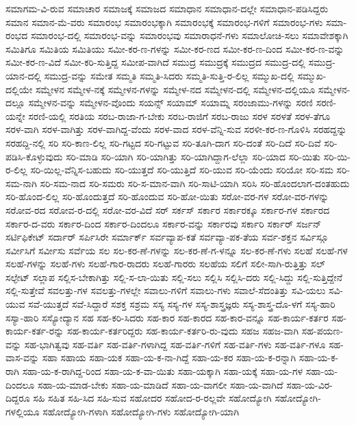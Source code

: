 {ಸಮಾಗಮ-ವಿ-ರುವ
ಸಮಾಚಾರ
ಸಮಾಜಕ್ಕೆ
ಸಮಾಜದ
ಸಮಾಧಾನ
ಸಮಾಧಾನ-ದಲ್ಲೇ
ಸಮಾಧಾನ-ಪಡಿಸಿದ್ದರು
ಸಮಾನ
ಸಮಾನ-ಮೆ-ವರು
ಸಮಾರಂಭ
ಸಮಾರಂಭಕ್ಕಾಗಿ
ಸಮಾರಂಭಕ್ಕೆ
ಸಮಾರಂಭ-ಗಳಿಗೆ
ಸಮಾರಂಭ-ಗಳು
ಸಮಾ-ರಂಭದ
ಸಮಾರಂಭ-ದಲ್ಲಿ
ಸಮಾರಂಭ-ವನ್ನು
ಸಮಾರಂಭವು
ಸಮಾರಾಧನೆ-ಗಳು
ಸಮಾಲೋಚಿ-ಸಲು
ಸಮಾವೇಶಕ್ಕಾಗಿ
ಸಮಿತಿಗೂ
ಸಮಿತಿಯ
ಸಮಿತಿಯು
ಸಮೀ-ಕರ-ಣ-ಗಳನ್ನು
ಸಮೀ-ಕರ-ಣದ
ಸಮೀ-ಕರ-ಣ-ದಿಂದ
ಸಮೀ-ಕರ-ಣ-ವನ್ನು
ಸಮೀ-ಕರ-ಣ-ವಿದೆ
ಸಮೀ-ಕರಿ-ಸುತ್ತಿದ್ದ
ಸಮೀಪ-ವಾಗಿದೆ
ಸಮುದ್ರ
ಸಮುದ್ರಕ್ಕೆ
ಸಮುದ್ರದ
ಸಮುದ್ರ-ದಲ್ಲಿ
ಸಮುದ್ರ-ಯಾನ-ದಲ್ಲಿ
ಸಮುದ್ರ-ವನ್ನು
ಸಮೇತ
ಸಮ್ಮತಿ
ಸಮ್ಮತಿ-ಸಿದರು
ಸಮ್ಮತಿ-ಸುತ್ತಿ-ರ-ಲಿಲ್ಲ
ಸಮ್ಮುಖ-ದಲ್ಲಿ
ಸಮ್ಮುಖ-ದಲ್ಲಿಯೇ
ಸಮ್ಮೇಳನ
ಸಮ್ಮೇಳ-ನಕ್ಕೆ
ಸಮ್ಮೇಳನ-ಗಳನ್ನು
ಸಮ್ಮೇಳ-ನದ
ಸಮ್ಮೇಳನ-ದಲ್ಲಿ
ಸಮ್ಮೇಳನ-ದಲ್ಲಿಯೂ
ಸಮ್ಮೇಳನ-ದಲ್ಲೂ
ಸಮ್ಮೇಳನ-ವನ್ನು
ಸಮ್ಮೇಳನ-ವೊಂದು
ಸಯನ್ಸ್
ಸಯಾಮ್
ಸಯಾಮ್ನ
ಸರಂಜಾಮು-ಗಳನ್ನು
ಸರಣಿ
ಸರಣಿ-ಯನ್ನೇ
ಸರಣಿ-ಯಲ್ಲಿ
ಸರತಿಯ
ಸರಬ-ರಾಜಾ-ಗ-ಬೇಕು
ಸರಬ-ರಾಜಿಗೆ
ಸರಬ-ರಾಜು
ಸರಳ
ಸರಳತೆ
ಸರಳ-ತೆಗೂ
ಸರಳ-ವಾಗಿ
ಸರಳ-ವಾಗಿತ್ತು
ಸರಳ-ವಾಗಿದ್ದ-ವೆಂದು
ಸರಳ-ವಾದ
ಸರಳ-ವೆನ್ನಿ-ಸುವ
ಸರಳೀ-ಕರ-ಣ-ಗೊಳಿಸಿ
ಸರಹದ್ದನ್ನು
ಸರಹದ್ದಿ-ನಲ್ಲಿ
ಸರಿ
ಸರಿ-ಕಾಣ-ಲಿಲ್ಲ
ಸರಿ-ಗಟ್ಟದ
ಸರಿ-ಗಟ್ಟುವ
ಸರಿ-ತೂಗಿ-ದಾಗ
ಸರಿ-ದಂತೆ
ಸರಿ-ದಿದೆ
ಸರಿ-ದಿವೆ
ಸರಿ-ಪಡಿಸಿ-ಕೊಳ್ಳುವುದು
ಸರಿ-ಮಾಡಿ
ಸರಿ-ಯಾಗಿ
ಸರಿ-ಯಾಗಿತ್ತು
ಸರಿ-ಯಾಗಿದ್ದಾಗ-ಲೆಲ್ಲಾ
ಸರಿ-ಯಾದ
ಸರಿ-ಯಿತು
ಸರಿ-ಯಿ-ರ-ಲಿಲ್ಲ
ಸರಿ-ಯಿಲ್ಲ-ವೆನ್ನಿಸ-ಬಹುದು
ಸರಿ-ಯುತ್ತದೆ
ಸರಿ-ಯುತ್ತಿದೆ
ಸರಿ-ಯುವ
ಸರಿ-ಯೆಂದು
ಸರಿಯೋ
ಸರಿ-ಸಮ
ಸರಿ-ಸಮ-ನಾಗಿ
ಸರಿ-ಸಮ-ನಾದ
ಸರಿ-ಸಮರು
ಸರಿ-ಸ-ಮಾನ-ವಾಗಿ
ಸರಿ-ಸಾಟಿ-ಯಾಗಿ
ಸರಿಸಿ
ಸರಿ-ಹೊಂದಲಾಗ-ದಂತಹುದು
ಸರಿ-ಹೊಂದ-ಲಿಲ್ಲ
ಸರಿ-ಹೊಂದುತ್ತದೆ
ಸರಿ-ಹೊಂದುವ
ಸರಿ-ಹೋ-ಯಿತು
ಸರೋ-ವರ-ಗಳ
ಸರೋ-ವರ-ಗಳನ್ನು
ಸರೋವ-ರದ
ಸರೋವ-ರ-ದಲ್ಲಿ
ಸರೋ-ವರ-ವಿದೆ
ಸರ್
ಸರ್ಕಸ್
ಸರ್ಕಾರ
ಸರ್ಕಾರಕ್ಕೂ
ಸರ್ಕಾರ-ಗಳ
ಸರ್ಕಾರದ
ಸರ್ಕಾರ-ದ-ವರು
ಸರ್ಕಾರ-ದಿಂದ
ಸರ್ಕಾರ-ದಿಂದಲೂ
ಸರ್ಕಾರ-ವನ್ನು
ಸರ್ಕಾರವು
ಸರ್ಕಾರಿ
ಸರ್ಕಾರ್
ಸರ್ಜನ್
ಸರ್ಟಿಫಿಕೇಟ್
ಸರ್ದಾರ್
ಸರ್ಪಿಸಿರೇ
ಸರ್ಮಾರ್ಕ್
ಸರ್ವವ್ಯಾಪ-ಕತೆ
ಸರ್ವವ್ಯಾ-ಪಕ-ತೆಯ
ಸರ್ವ-ಶಕ್ತನ
ಸರ್ವಿಸ್ಗೂ
ಸರ್ವೀಸಿಗೆ
ಸರ್ವೀಸು
ಸರ್ವೆಯ
ಸಲ
ಸಲ-ಕರ-ಣೆ-ಗಳನ್ನು
ಸಲ-ಕರ-ಣೆ-ಗ-ಳನ್ನೂ
ಸಲ-ಕರ-ಣೆ-ಗಳು
ಸಲಹೆ
ಸಲಹೆ-ಗಳ
ಸಲಹೆ-ಗಳನ್ನು
ಸಲಹೆ-ಗಳು
ಸಲಹೆ-ಗಾರ-ರಾದರು
ಸಲಹೆ-ಗಾರರು
ಸಲಹೆಯ
ಸಲಿಗೆ
ಸಲೀ-ಸಾಗಿ-ರುತ್ತಿತ್ತು
ಸಲ್
ಸಲ್ಫೇಟ್
ಸಲ್ಲಾಪ
ಸಲ್ಲಿಸ-ಬೇಕಾಗಿತ್ತು
ಸಲ್ಲಿ-ಸ-ಲಾ-ಯಿತು
ಸಲ್ಲಿ-ಸಲು
ಸಲ್ಲಿಸಿ
ಸಲ್ಲಿಸಿ-ದರು
ಸಲ್ಲಿ-ಸಿದ್ದು
ಸಲ್ಲಿ-ಸುತ್ತಿದ್ದೇನೆ
ಸಲ್ಲಿ-ಸುತ್ತೇವೆ
ಸವಲತ್ತು-ಗಳ
ಸವಲತ್ತು-ಗಳಲ್ಲೇ
ಸವಾಲು-ಗಳಿಗೆ
ಸವಾಲು-ಗಳು
ಸವಾಲೆ-ಸೆದಂತಿತ್ತು
ಸವಿ-ಯಲು
ಸವಿ-ಯುವ
ಸವೆ-ಯುತ್ತದೆ
ಸವೆ-ಸಿದ್ದಾರೆ
ಸಶಕ್ತ
ಸಶ್ರಮ
ಸಸ್ಯ
ಸಸ್ಯ-ಗಳ
ಸಸ್ಯ-ಶಾಸ್ತ್ರಜ್ಞರು
ಸಸ್ಯ-ಶಾಸ್ತ್ರ-ದೊ-ಳಗೆ
ಸಸ್ಯ-ಹಾರಿ
ಸಸ್ಯಾ-ಹಾರಿ
ಸಸ್ಯೋದ್ಯಾನ
ಸಹ
ಸಹ-ಕರಿ-ಸಿದರು
ಸಹ-ಕಾರ
ಸಹ-ಕಾರದ
ಸಹ-ಕಾರ-ವನ್ನೂ
ಸಹ-ಕಾರ್ಯ-ಕರ್ತರ
ಸಹ-ಕಾರ್ಯ-ಕರ್ತ-ರನ್ನು
ಸಹ-ಕಾರ್ಯ-ಕರ್ತರಿದ್ದರು
ಸಹ-ಕಾರ್ಯ-ಕರ್ತರಿ-ರು-ವುದು
ಸಹಜ
ಸಹಜ-ವಾಗಿ
ಸಹ-ಪಯಣ-ವನ್ನು
ಸಹ-ಭಾಗಿತ್ವವು
ಸಹ-ವರ್ತಿ
ಸಹ-ವರ್ತಿ-ಗಳಾಗಿದ್ದ
ಸಹ-ವರ್ತಿ-ಗಳಿಗೆ
ಸಹ-ವರ್ತಿ-ಗಳು
ಸಹ-ವರ್ತಿ-ಗಳೂ
ಸಹ-ವಾಸ-ವನ್ನು
ಸಹಾ
ಸಹಾಯ
ಸಹಾ-ಯಕ
ಸಹಾ-ಯ-ಕ-ನಾ-ಗಿದ್ದೆ
ಸಹಾ-ಯ-ಕರ
ಸಹಾ-ಯ-ಕ-ರನ್ನಾಗಿ
ಸಹಾ-ಯ-ಕ-ರಾಗಿ
ಸಹಾ-ಯ-ಕ-ರಾಗಿದ್ದ-ರಿಂದ
ಸಹಾ-ಯ-ಕ-ವಾ-ಯಿತು
ಸಹಾ-ಯಕ್ಕಾಗಿ
ಸಹಾ-ಯಕ್ಕೆ
ಸಹಾ-ಯ-ಗಳ
ಸಹಾ-ಯ-ದಿಂದಲೂ
ಸಹಾ-ಯ-ಮಾಡ-ಬೇಕು
ಸಹಾ-ಯ-ಮಾಡಿದೆ
ಸಹಾ-ಯ-ವಾಗಲೀ
ಸಹಾ-ಯ-ವಾಗಿದೆ
ಸಹಾ-ಯ-ವಿರ-ದಿದ್ದರೂ
ಸಹಿ
ಸಹಿತ
ಸಹಿ-ಸಿದ
ಸಹಿ-ಸುವ
ಸಹೋದರ
ಸಹೋದ-ರ-ರಲ್ಲವೇ
ಸಹೋದ್ಯೋಗಿ
ಸಹೋದ್ಯೋಗಿ-ಗಳಲ್ಲಿಯೂ
ಸಹೋದ್ಯೋಗಿ-ಗಳಾಗಿ
ಸಹೋದ್ಯೋಗಿ-ಗಳು
ಸಹೋದ್ಯೋಗಿ-ಯಾಗಿ
}
